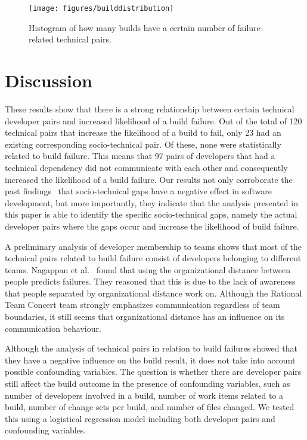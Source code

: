 \begin{figure}[t]
\centering
\vspace{-1cm}
\texttt{[image: figures/builddistribution]}
\vspace{-.75cm}
\caption{Histogram of how many builds have a certain number of failure-related technical pairs.}
\label{fig:builddistribution}
\end{figure}

\vspace{-9pt}
\section{Discussion}
\vspace{-8pt}
\label{ch8:dis}
These results show that there is a strong relationship between certain technical
developer pairs and increased likelihood of a build failure.
Out of the total of 120 technical pairs that increase the likelihood of a
build to fail, only 23 had an existing
corresponding socio-technical pair. Of these, none were statistically
related to build failure. This means that 97 pairs of developers that had a
technical dependency did not communicate with each other and
consequently increased the likelihood of a build failure. Our results not only
corroborate the past findings~\cite{cataldo:cscw:2006,cataldo:esem:2008} that socio-technical gaps
have a negative effect in software development, but more importantly, they indicate
that the analysis presented in this paper is able to identify the specific
socio-technical gaps, namely the actual developer pairs where the gaps occur
and increase the likelihood of build failure. 

A preliminary analysis of developer membership to teams shows that most
of the technical pairs related to build failure consist of developers belonging to
different teams. Nagappan et al.~\cite{nagappan:icse:2008} found that using the
organizational distance between people predicts failures. They reasoned that this
is due to the lack of awareness that people separated by organizational distance
work on. Although the Rational Team Concert team strongly emphasizes communication
regardless of team boundaries, it still seems that organizational distance has
an influence on its communication behaviour.


Although the analysis of technical pairs in relation to build failures
showed that they have a negative influence on the build result, it does not take
into account possible confounding variables. The question is whether there are developer pairs still affect the build outcome in the presence of confounding variables, such as number of developers involved in a build, number of work items
related to a build, number of change sets per build, and number of files changed.
We tested this using a logistical regression model including both developer pairs and confounding variables.

